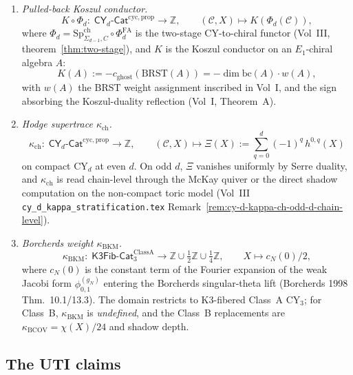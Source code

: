 \documentclass[11pt]{article}
\theoremstyle{definition}
\newcommand{\kch}{\kappa_{\mathrm{ch}}}
\newcommand{\kBKM}{\kappa_{\mathrm{BKM}}}
\newcommand{\SpCh}{\mathrm{Sp}^{\mathrm{ch}}}
\newcommand{\PhiFA}{\Phi^{\mathrm{FA}}}
\newcommand{\BRST}{\mathrm{BRST}}
\begin{document}
\begin{enumerate}[(F1)]
\item \emph{Pulled-back Koszul conductor.}
\[
   K \circ \Phi_d \colon\;
   \mathsf{CY}_d\text{-}\mathsf{Cat}^{\mathrm{cyc},\mathrm{prop}}
   \longrightarrow \mathbb{Z},
   \qquad
   (\mathcal{C}, X) \longmapsto K(\Phi_d(\mathcal{C})),
\]
where $\Phi_d = \SpCh_{\Sigma_{d-1}, C} \circ \PhiFA_d$ is the two-stage
CY-to-chiral functor (Vol~III, theorem~\ref{thm:two-stage}), and $K$ is
the Koszul conductor on an $E_1$-chiral algebra $A$:
\[
   K(A) := -c_{\mathrm{ghost}}(\BRST(A))
         = -\dim \mathrm{bc}(A) \cdot w(A),
\]
with $w(A)$ the BRST weight assignment inscribed in Vol~I, and the sign
absorbing the Koszul-duality reflection (Vol~I, Theorem~A).

\item \emph{Hodge supertrace $\kch$.}
\[
   \kch \colon\;
   \mathsf{CY}_d\text{-}\mathsf{Cat}^{\mathrm{cyc},\mathrm{prop}}
   \longrightarrow \mathbb{Z},
   \qquad
   (\mathcal{C}, X) \longmapsto \Xi(X)
                     := \sum_{q=0}^{d} (-1)^q\, h^{0,q}(X)
\]
on compact CY$_d$ at even $d$. On odd $d$, $\Xi$ vanishes uniformly by
Serre duality, and $\kch$ is read chain-level through the McKay quiver
or the direct shadow computation on the non-compact toric model (Vol~III
\texttt{cy\_d\_kappa\_stratification.tex} Remark~\ref{rem:cy-d-kappa-ch-odd-d-chain-level}).

\item \emph{Borcherds weight $\kBKM$.}
\[
   \kBKM \colon\;
   \mathsf{K3Fib}\text{-}\mathsf{Cat}_3^{\mathrm{Class A}}
   \longrightarrow \mathbb{Z} \cup \tfrac{1}{2}\mathbb{Z}
                     \cup \tfrac{1}{4}\mathbb{Z},
   \qquad
   X \longmapsto c_N(0)/2,
\]
where $c_N(0)$ is the constant term of the Fourier expansion of the
weak Jacobi form $\phi^{(g_N)}_{0,1}$ entering the Borcherds singular-theta
lift (Borcherds 1998 Thm.~10.1/13.3). The domain restricts to K3-fibered
Class~A CY$_3$; for Class~B, $\kBKM$ is \emph{undefined}, and the Class~B
replacements are $\kappa_{\mathrm{BCOV}} = \chi(X)/24$ and shadow depth.
\end{enumerate}

\subsection{The UTI claims}
\end{document}

